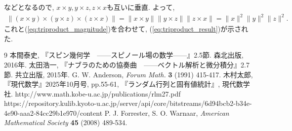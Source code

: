 \documentclass{ltjsarticle}
\theoremstyle{definition}
\begin{document}
などとなるので, $x\times y, y\times z, z\times x$も互いに垂直. よって,
\begin{gather}
  \|(x\times y)\times(y\times z)\times(z\times x)\|=\|x\times y\|\|y\times z\|\|z\times x\|=\|x\|^2\|y\|^2\|z\|^2.
\end{gather}
これと(\ref{eq:triproduct_magnitude})を合わせて, (\ref{eq:triproduct_result})が示された.
\begin{thebibliography}{9}
 本間泰史, 『スピン幾何学　------スピノール場の数学------』2.5節. 森北出版, 2016年. 
 太田浩一, 『ナブラのための協奏曲　------ベクトル解析と微分積分』2.7節. 共立出版, 2015年.
 G. W. Anderson, {\it Forum Math.} \textbf{3} (1991) 415-417.
 木村太郎, 『現代数学』2025年10月号, pp.55-61, 『ランダム行列と固有値統計』, 現代数学社.
 http://www.math.kobe-u.ac.jp/publications/rlm27.pdf
 https://repository.kulib.kyoto-u.ac.jp/server/api/core/bitstreams/6d94bcb2-b34e-4e90-aaa2-84cc29b1e970/content
 P. J. Forrester, S. O. Warnaar, {\it American Mathematical Society} \textbf{45} (2008) 489-534.
\end{thebibliography}
\end{document}
